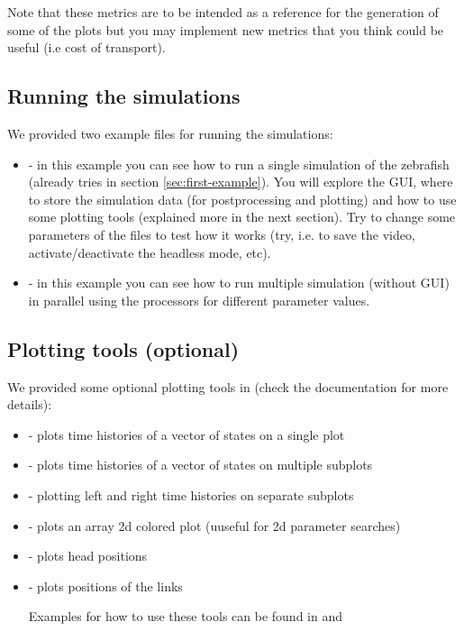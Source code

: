 \documentclass{cmc}
\begin{document}
Note that these metrics are to be intended as a reference for the generation of some of the plots but you
may implement new metrics that you think could be useful (i.e cost of transport).


\subsection*{Running the simulations}\label{subsec:simulating}
We provided two example files for running the simulations:
\begin{itemize}
\item {} - in this example you can see how to run a single simulation of the zebrafish (already tries in section \ref{sec:first-example}). You will explore the GUI, where to store the simulation data (for postprocessing and plotting) and how to use some plotting tools (explained more in the next section). Try to change some parameters of the  files to test how it works (try, i.e. to save the video, activate/deactivate the headless mode, etc).
\item {} - in this example you can see how to run multiple simulation (without GUI) in parallel using the processors for different parameter values.
\end{itemize}


\subsection*{Plotting tools (optional)}\label{subsec:plotting}
We provided some optional plotting tools in  (check the documentation for more details):
\begin{itemize}
\item {} - plots time histories of a vector of states on a single plot
\item {} - plots time histories of a vector of states on multiple subplots
\item {} - plotting left and right time histories on separate subplots
\item {} - plots an array 2d colored plot (uuseful for 2d parameter searches)
\item {} - plots head positions
\item {} - plots positions of the links

Examples for how to use these tools can be found in  and 

\end{itemize}
\end{document}
